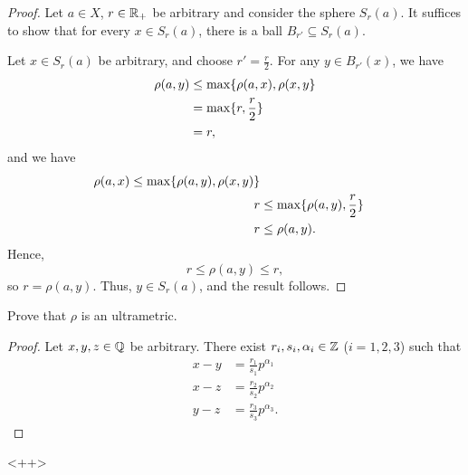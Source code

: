 \begin{proof}
    Let $a \in X$, $r \in \mathbb{R}_+$ be arbitrary and consider the sphere $S_r(a)$.
    It suffices to show that for every $x \in S_r(a)$, there is a ball $B_{r'}
    \subseteq S_r(a)$. 

    Let $x \in S_r(a)$ be arbitrary, and choose $r' = \frac{r}{2}$. For any $y
    \in B_{r'}(x)$, we have
    \begin{align*}
        \rho(a, y) &\leq \max \{\rho(a, x), \rho(x, y\} \\
        &= \max \{r, \frac{r}{2}\} \\
        &= r,
    \end{align*}
    and we have
    \begin{align*}
        \rho(a, x) \leq \max \{\rho(a, y), \rho(x, y)\} \\
        r &\leq \max \{\rho(a, y), \frac{r}{2}\} \\
        r &\leq \rho(a, y).
    \end{align*}
    Hence,
    \[
        r \leq \rho(a, y) \leq r,
    \]
    so $r = \rho(a, y)$. Thus, $y \in S_{r}(a)$, and the result follows.
\end{proof}


\begin{majorEx}
    Prove that $\rho$ is an ultrametric.
\end{majorEx}

\begin{proof}
    Let $x, y, z \in \mathbb{Q}$ be arbitrary. There exist $r_i, s_i, \alpha_i \in \mathbb{Z}$
    ($i = 1, 2, 3$) such that
    \begin{align*}
        x - y &= \frac{r_1}{s_1} p^{\alpha_1} \\
        x - z &= \frac{r_2}{s_2} p^{\alpha_2} \\
        y - z &= \frac{r_3}{s_3} p^{\alpha_3}.
    \end{align*}

\end{proof}<++>
